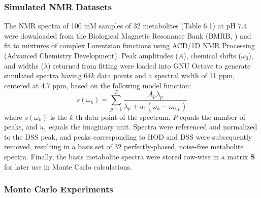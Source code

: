 \subsubsection{Simulated NMR Datasets}

\begin{doublespace}
The \hnmr{} NMR spectra of 100 mM samples of 32 metabolites (Table 6.1) at
pH 7.4 were downloaded from the Biological Magnetic Resonance Bank
(BMRB, \cite{ulrich:nar2008}) and fit to mixtures of complex Lorentzian
functions using ACD/1D NMR Processing (Advanced Chemistry Development).
Peak amplitudes ($A$), chemical shifts ($\omega_0$), and widths ($\lambda$)
returned from fitting were loaded into GNU Octave to generate simulated spectra
having 64$k$ data points and a spectral width of 11 ppm, centered at
4.7 ppm, based on the following model function:
\begin{equation}
s(\omega_k) =
 \sum_{p=1}^P
 \frac{A_p \lambda_p}
      {\lambda_p + u_1 (\omega_k - \omega_{0,p})}
\end{equation}
where $s(\omega_k)$ is the $k$-th data point of the spectrum, $P$ equals the
number of peaks, and $u_1$ equals the imaginary unit. Spectra were referenced
and normalized to the DSS peak, and peaks corresponding to HOD and DSS were
subsequently removed, resulting in a basis set of 32 perfectly-phased,
noise-free metabolite spectra. Finally, the basis metabolite spectra were
stored row-wise in a matrix $\mathbf{S}$ for later use in Monte Carlo
calculations.
\end{doublespace}

\subsubsection{Monte Carlo Experiments}

